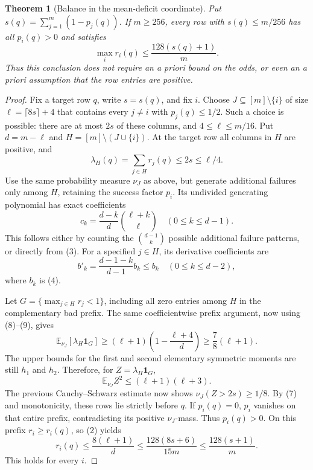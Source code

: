\documentclass[11pt]{article}
\newtheorem{theorem}{Theorem}
\newcommand{\E}{\mathbb E}
\begin{document}
\begin{theorem}[Balance in the mean-deficit coordinate]\label{deficit}
Put $s(q)=\sum_{j=1}^m(1-p_j(q))$. If $m\ge256$, every row with
$s(q)\le m/256$ has all $p_i(q)>0$ and satisfies
\[
 \max_i r_i(q)\le\frac{128(s(q)+1)}m.              \tag{6}
\]
Thus this conclusion does not require an a priori bound on the odds,
or even an a priori assumption that the row entries are positive.
\end{theorem}
\begin{proof}
Fix a target row $q$, write $s=s(q)$, and fix $i$. Choose
$J\subseteq[m]\setminus\{i\}$ of size $\ell=\lceil8s\rceil+4$
that contains every $j\ne i$ with $p_j(q)\le1/2$. Such a choice is
possible: there are at most $2s$ of these columns, and
$4\le\ell\le m/16$. Put $d=m-\ell$ and
$H=[m]\setminus(J\cup\{i\})$. At the target row all columns in
$H$ are positive, and
\[
 \lambda_H(q)=\sum_{j\in H}r_j(q)\le2s\le\ell/4. \tag{7}
\]
Use the same probability measure $\nu_J$ as above, but generate
additional failures only among $H$, retaining the success factor
$p_i$. Its undivided generating polynomial has exact coefficients
\[
 c_k=\frac{d-k}{d}\binom{\ell+k}{\ell}
       \quad(0\le k\le d-1).                     \tag{8}
\]
This follows either by counting the $\binom{d-1}{k}$ possible
additional failure patterns, or directly from (3).
For a specified $j\in H$, its derivative coefficients are
\[
 b'_k=\frac{d-1-k}{d-1}b_k\le b_k
       \quad(0\le k\le d-2),                     \tag{9}
\]
where $b_k$ is (4).

Let $G=\{\max_{j\in H}r_j<1\}$, including all zero entries among
$H$ in the complementary bad prefix. The same coefficientwise
prefix argument, now using (8)--(9), gives
\[
 \E_{\nu_J}[\lambda_H\boldsymbol1_G]
 \ge(\ell+1)\left(1-\frac{\ell+4}{d}\right)
 \ge\frac78(\ell+1).
\]
The upper bounds for the first and second elementary symmetric
moments are still $h_1$ and $h_2$. Therefore, for
$Z=\lambda_H\boldsymbol1_G$,
\[
 \E_{\nu_J}Z^2\le(\ell+1)(\ell+3).
\]
The previous Cauchy--Schwarz estimate now shows
$\nu_J(Z>2s)\ge1/8$. By (7) and monotonicity, these rows lie
strictly before $q$. If $p_i(q)=0$, $p_i$ vanishes on that entire
prefix, contradicting its positive $\nu_J$-mass. Thus $p_i(q)>0$.
On this prefix $r_i\ge r_i(q)$, so (2) yields
\[
 r_i(q)\le\frac{8(\ell+1)}d
 \le\frac{128(8s+6)}{15m}
 \le\frac{128(s+1)}m.
\]
This holds for every $i$.
\end{proof}
\end{document}
